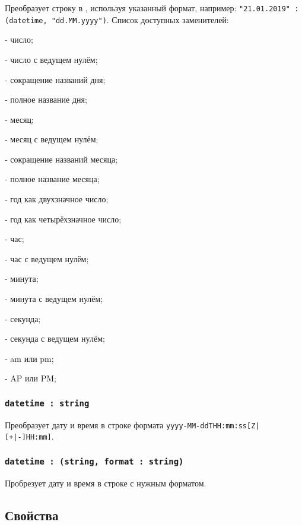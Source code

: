 Преобразует строку  в , используя указанный формат, например: \lstinline|"21.01.2019" : (datetime, "dd.MM.yyyy")|. Список доступных заменителей:
\begin{icItems}
	\item {} - число;
	\item {} - число с ведущем нулём;
	\item {} - сокращение названий дня;
	\item {} - полное название дня;
	\item {} - месяц;
	\item {} - месяц с ведущем нулём;
	\item {} - сокращение названий месяца;
	\item {} - полное название месяца;
	\item {} - год как двухзначное число;
	\item {} - год как четырёхзначное число;
	\item {} - час;
	\item {} - час с ведущем нулём;
	\item {} - минута;
	\item {} - минута с ведущем нулём;
	\item {} - секунда;
	\item {} - секунда с ведущем нулём;
	\item {} - am или pm;
	\item {} - AP или PM;
\end{icItems}

\subsubsection{\lstinline|datetime : string|}

Преобразует дату и время в строке формата \lstinline`yyyy-MM-ddTHH:mm:ss[Z|[+|-]HH:mm]`.

\subsubsection{\lstinline|datetime : (string, format : string)|}

Пробрезует дату и время в строке с нужным форматом.

\subsection{Свойства}


